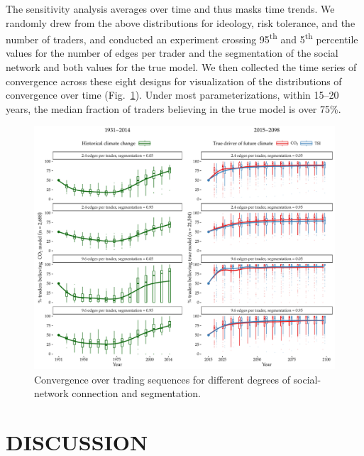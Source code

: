 \documentclass{wscpaperproc}\usepackage[]{graphicx}\usepackage[]{color}
\makeatletter
\def\maxwidth{ %
  \ifdim\Gin@nat@width>\linewidth
    \linewidth
  \else
    \Gin@nat@width
  \fi
}
\newenvironment{knitrout}{}{} %
\makeatother
\begin{document}
The sensitivity analysis averages over time and thus masks time trends. We randomly drew from the above distributions for ideology, risk tolerance, and the number of traders, and conducted an experiment crossing 95\textsuperscript{th} and 5\textsuperscript{th} percentile values for the number of edges per trader and the segmentation of the social network and both values for the true model. We then collected the time series of convergence across these eight designs for visualization of the distributions of convergence over time (Fig.~\ref{fig:time}). Under most parameterizations, within 15--20 years, the median fraction of traders believing in the true model is over 75\%.

\begin{knitrout}
\color{fgcolor}\begin{figure}[t]

{\centering \includegraphics[width=\maxwidth]{figure/time-1} 

}

\caption[Convergence over trading sequences for different degrees of social-network connection and segmentation]{Convergence over trading sequences for different degrees of social-network connection and segmentation.}\label{fig:time}
\end{figure}


\end{knitrout}

\section{DISCUSSION}
\end{document}
